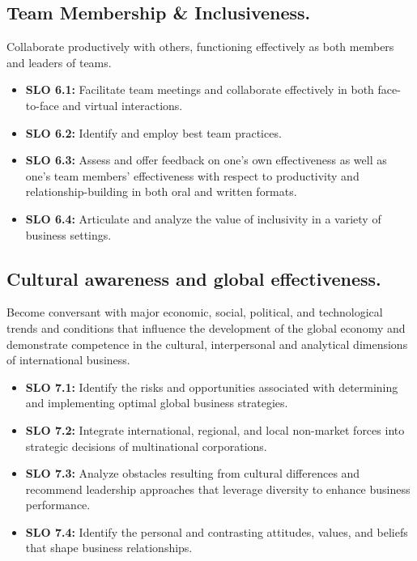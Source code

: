 \documentclass[12pt]{article} %
\begin{document}
\subsection{Team Membership \& Inclusiveness.}
Collaborate productively with others, functioning effectively as both members and leaders of teams.
\begin{itemize}
	\item\textbf{SLO 6.1:} Facilitate team meetings and collaborate effectively in both face-to-face and virtual interactions.
	\item\textbf{SLO 6.2:} Identify and employ best team practices.
	\item\textbf{SLO 6.3:} Assess and offer feedback on one’s own effectiveness as well as one’s team members’ effectiveness with respect to productivity and relationship-building in both oral and written formats.
	\item\textbf{SLO 6.4:} Articulate and analyze the value of inclusivity in a variety of business settings.
\end{itemize}
\subsection{Cultural awareness and global effectiveness.}
Become conversant with major economic, social, political, and technological trends and conditions that influence the development of the global economy and demonstrate competence in the cultural, interpersonal and analytical dimensions of international business.
\begin{itemize}
	\item\textbf{SLO 7.1:} Identify the risks and opportunities associated with determining and implementing optimal global business strategies.
	\item\textbf{SLO 7.2:} Integrate international, regional, and local non-market forces into strategic decisions of multinational corporations.
	\item\textbf{SLO 7.3:} Analyze obstacles resulting from cultural differences and recommend leadership approaches that leverage diversity to enhance business performance.
	\item\textbf{SLO 7.4:} Identify the personal and contrasting attitudes, values, and beliefs that shape business relationships.
\end{itemize}

\end{document}
